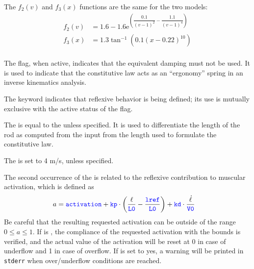 The $f_2(v)$ and $f_3(x)$ functions are the same for the two models:
\begin{align}
  f_2(v) &= 1.6 - 1.6\mathrm{e}^{\left(\dfrac{0.1}{(v - 1)^2} - \dfrac{1.1}{(v - 1)^4}\right)} \\
  f_3(x) &= 1.3\tan^{-1}(0.1(x - 0.22)^{10}) \\
\end{align}

The  flag, when active, indicates that the equivalent damping must not be
used. It is used to indicate that the constitutive law acts as an ``ergonomy'' spring in
an inverse kinematics analysis.

The  keyword indicates that reflexive behavior is being defined;
its use is mutually exclusive with the active status of the  flag.

The  is equal to the  unless specified.
It is used to differentiate the length of the rod as computed from the input
from the length used to formulate the constitutive law.

The  is set to 4 m/s, unless specified.

The second occurrence of the  is related
to the reflexive contribution to muscular activation, which is defined as
\begin{align}
	a
	&=
	\textcolor{blue}{\texttt{activation}}
	+
	\textcolor{blue}{\texttt{kp}} \cdot \left( 
		\frac{\ell}{\textcolor{blue}{\texttt{L0}}}
		-
		\frac{\textcolor{blue}{\texttt{lref}}}{\textcolor{blue}{\texttt{L0}}}
	 \right)
	+
	\textcolor{blue}{\texttt{kd}} \cdot \frac{\dot{\ell}}{\textcolor{blue}{\texttt{V0}}}
\end{align}
Be careful that the resulting requested activation can be outside of the range 
${0 \leq a \leq 1}$. If  is , the compliance of
the requested activation with the bounds is verified, and the actual value of the
activation will be reset at 0 in case of underflow and 1 in case of overflow. If 
is set to yes, a warning will be printed in \texttt{stderr} when over/underflow conditions
are reached. 

